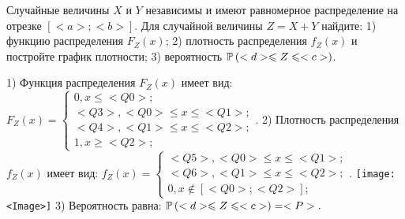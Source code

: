 \documentclass{article}%
\begin{document}
\begin{problem}
Случайные величины $X$ и $Y$ независимы и имеют равномерное
распределение на отрезке $[<a>;<b>]$. Для случайной величины $Z=X+Y$ найдите:
1) функцию распределения $F_Z(x)$;
2) плотность распределения $f_Z(x)$ и постройте график плотности;
3) вероятность $\P(<d>\leqslant Z\leqslant<c>)$.
\end{problem}

\begin{solution*}
1) Функция распределения $F_Z(x)$ имеет вид:
$
F_Z(x)=\left\{
\begin{array}{l}
0, x\leqslant <Q0>;\\
<Q3>, <Q0>\leqslant x\leqslant <Q1>;\\
<Q4>, <Q1>\leqslant x\leqslant <Q2>;\\
1, x\geqslant <Q2>;
\end{array}.
\right.
$
2) Плотность распределения $f_Z(x)$ имеет вид:
$
f_Z(x)=\left\{
\begin{array}{l}
<Q5>, <Q0>\leqslant x\leqslant <Q1>;\\
<Q6>, <Q1>\leqslant x\leqslant <Q2>;\\
0, x\not\in [<Q0>;<Q2>];
\end{array}.
\right.
$
\texttt{[image: <Image>]}
3) Вероятность равна:
$
\P(<d>\leqslant Z\leqslant<c>)=<P>.
$
\end{solution*}
\end{document}
